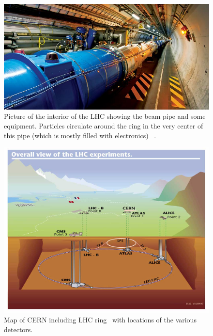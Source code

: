 	
			\begin{figure}[h]
\begin{center}
\includegraphics[width=0.8\linewidth]{Figs/lhc_beampipe.jpg}
\caption{\label{fig:lhc_beampipe}
Picture of the interior of the LHC showing the beam pipe and some equipment. Particles circulate around the ring in the very center of this pipe (which is mostly filled with electronics) ~\cite{cernlhc}.
}
\end{center}
\end{figure} 
			

\begin{figure}[h]
\begin{center}
\includegraphics[width=0.8\linewidth]{Figs/lhclayout.jpg}
\caption{\label{fig:lhclayout}
Map of CERN including LHC ring~\cite{lhclayout} with locations of the various detectors.
}
\end{center}
\end{figure} 
	
	
